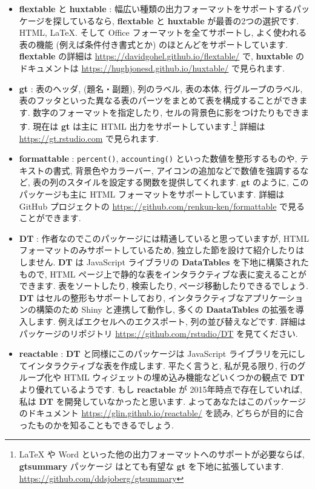 \documentclass[
  11pt,
]{bxjsreport}
\begin{document}
\begin{itemize}
\item
  \textbf{flextable} \autocite{R-flextable} と \textbf{huxtable} \autocite{R-huxtable}: 幅広い種類の出力フォーマットをサポートするパッケージを探しているなら, \textbf{flextable} と \textbf{huxtable} が最善の2つの選択です. HTML, LaTeX. そして Office フォーマットを全てサポートし, よく使われる表の機能 (例えば条件付き書式とか) のほとんどをサポートしています. \textbf{flextable} の詳細は \url{https://davidgohel.github.io/flextable/} で, \textbf{huxtable} のドキュメントは \url{https://hughjonesd.github.io/huxtable/} で見られます.
\item
  \textbf{gt} \autocite{R-gt}: 表のヘッダ, (題名・副題), 列のラベル, 表の本体, 行グループのラベル, 表のフッタといった異なる表のパーツをまとめて表を構成することができます. 数字のフォーマットを指定したり, セルの背景色に影をつけたりもできます. 現在は \textbf{gt} は主に HTML 出力をサポートしています.\footnote{LaTeX や Word といった他の出力フォーマットへのサポートが必要ならば, \textbf{gtsummary} パッケージ \autocite{R-gtsummary} はとても有望な \textbf{gt} を下地に拡張しています. \url{https://github.com/ddsjoberg/gtsummary}} 詳細は \url{https://gt.rstudio.com} で見られます.
\item
  \textbf{formattable} \autocite{R-formattable}: \texttt{percent()}, \texttt{accounting()} といった数値を整形するものや, テキストの書式, 背景色やカラーバー, アイコンの追加などで数値を強調するなど, 表の列のスタイルを設定する関数を提供してくれます. \textbf{gt} のように, このパッケージも主に HTML フォーマットをサポートしています. 詳細は GitHub プロジェクトの \url{https://github.com/renkun-ken/formattable} で見ることができます.
\item
  \textbf{DT} \autocite{R-DT}: 作者なのでこのパッケージには精通していると思っていますが, HTML フォーマットのみサポートしているため, 独立した節を設けて紹介したりはしません. \textbf{DT} は JavaScript ライブラリの \textbf{DataTables} を下地に構築されたもので, HTML ページ上で静的な表をインタラクティブな表に変えることができます. 表をソートしたり, 検索したり, ページ移動したりできるでしょう. \textbf{DT} はセルの整形もサポートしており, インタラクティブなアプリケーションの構築のため Shiny と連携して動作し, 多くの \textbf{DaataTables} の拡張を導入します. 例えばエクセルへのエクスポート, 列の並び替えなどです. 詳細はパッケージのリポジトリ \url{https://github.com/rstudio/DT} を見てください.
\item
  \textbf{reactable} \autocite{R-reactable}: \textbf{DT} と同様にこのパッケージは JavaScript ライブラリを元にしてインタラクティブな表を作成します. 平たく言うと, 私が見る限り, 行のグループ化や HTML ウィジェットの埋め込み機能などいくつかの観点で \textbf{DT} より優れているようです. もし \textbf{reactable} が 2015年時点で存在していれば, 私は \textbf{DT} を開発していなかったと思います. よってあなたはこのパッケージのドキュメント \url{https://glin.github.io/reactable/} を読み, どちらが目的に合ったものかを知ることもできるでしょう.

\end{itemize}
\end{document}
